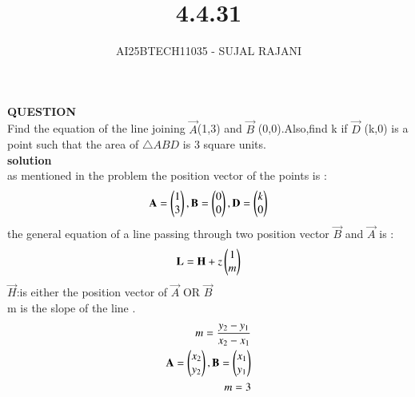 \documentclass[journal,12pt,onecolumn]{IEEEtran}
\begin{document}
\title{4.4.31}
\author{AI25BTECH11035 - SUJAL RAJANI}
{\let\newpage\relax\maketitle}
\textbf{QUESTION}
\\
Find the equation of the line joining $\vec{A}$(1,3) and $\vec{B}$ (0,0).Also,find k if $\vec{D}$ (k,0) is a point such that the area of $\triangle ABD$ is 3 square units.
\\
\textbf{solution}
\\
as mentioned in the problem the position vector of the points is :
\\
\begin{align*}
    \mathbf{A}=\begin{pmatrix}1\\3\end{pmatrix},\mathbf{B}=\begin{pmatrix}0\\0\end{pmatrix},\mathbf{D}=\begin{pmatrix}k\\0\end{pmatrix}
\end{align*}
the general equation of a line passing through two position vector $\vec{B}$ and $\vec{A}$ is :
\begin{align*}
    \mathbf{L}=\mathbf{H}+z\begin{pmatrix}1\\m\end{pmatrix}
\end{align*}
$\vec{H}$:is either the position vector of $\vec{A}$ OR $\vec{B}$
\\
m is the slope of the line .
\begin{align*}
    m=\dfrac{y_2-y_1}{x_2-x_1}
    \\
    \mathbf{A}=\begin{pmatrix}x_2\\y_2\end{pmatrix},\mathbf{B}=\begin{pmatrix}x_1\\y_1\end{pmatrix}
    \\
    m=3
\end{align*}
\end{document}
